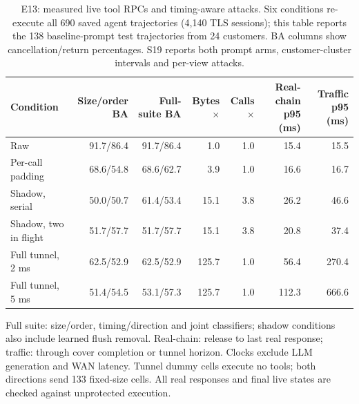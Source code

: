 \begin{table}[t]\centering\footnotesize
\caption{E13: measured live tool RPCs and timing-aware attacks. Six conditions re-execute all 690 saved agent trajectories (4,140 TLS sessions); this table reports the 138 baseline-prompt test trajectories from 24 customers. BA columns show cancellation/return percentages. S19 reports both prompt arms, customer-cluster intervals and per-view attacks.}\label{tab:r6-main}
\setlength{\tabcolsep}{4pt}
\begin{tabularx}{\textwidth}{@{}Yrrrrrr@{}}\toprule
Condition & Size/order BA & Full-suite BA & Bytes$\times$ & Calls$\times$ & Real-chain p95 (ms) & Traffic p95 (ms)\\\midrule
Raw & 91.7/86.4 & 91.7/86.4 & 1.0 & 1.0 & 15.4 & 15.5 \\
Per-call padding & 68.6/54.8 & 68.6/62.7 & 3.9 & 1.0 & 16.6 & 16.7 \\
Shadow, serial & 50.0/50.7 & 61.4/53.4 & 15.1 & 3.8 & 26.2 & 46.6 \\
Shadow, two in flight & 51.7/57.7 & 51.7/57.7 & 15.1 & 3.8 & 20.8 & 37.4 \\
Full tunnel, 2 ms & 62.5/52.9 & 62.5/52.9 & 125.7 & 1.0 & 56.4 & 270.4 \\
Full tunnel, 5 ms & 51.4/54.5 & 53.1/57.3 & 125.7 & 1.0 & 112.3 & 666.6 \\
\bottomrule\end{tabularx}
\par\smallskip\raggedright Full suite: size/order, timing/direction and joint classifiers; shadow conditions also include learned flush removal. Real-chain: release to last real response; traffic: through cover completion or tunnel horizon. Clocks exclude LLM generation and WAN latency. Tunnel dummy cells execute no tools; both directions send 133 fixed-size cells. All real responses and final live states are checked against unprotected execution.
\end{table}
